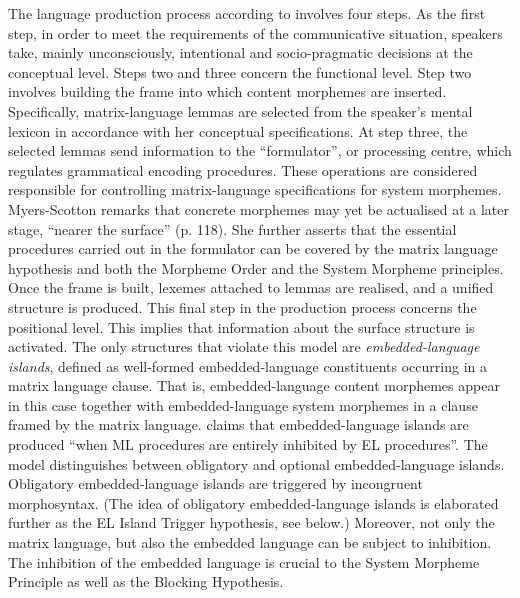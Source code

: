 The language production process according to \citet[116--119]{myers-scotton-duelling-1993} involves four steps. As the first step, in order to meet the requirements of the communicative situation, speakers take, mainly unconsciously, intentional and socio-pragmatic decisions at the conceptual level. Steps two and three concern the functional level. Step two involves building the frame into which content morphemes are inserted. Specifically, matrix-language lemmas are selected from the speaker's mental lexicon in accordance with her conceptual specifications. At step three, the selected lemmas send information to the ``formulator'', or processing centre, which regulates grammatical encoding procedures. These operations are considered responsible for controlling matrix-language specifications for system morphemes. Myers-Scotton remarks that concrete morphemes may yet be actualised at a later stage, ``nearer the surface'' (p. 118). She further asserts that the essential procedures carried out in the formulator can be covered by the matrix language hypothesis and both the Morpheme Order and the System Morpheme principles. Once the frame is built, lexemes attached to lemmas are realised, and a unified structure is produced. This final step in the production process concerns the positional level. This implies that information about the surface structure is activated. The only structures that violate this model are \textit{embedded-language islands}, defined as well-formed embedded-language constituents occurring in a matrix language clause. That is, embedded-language content morphemes appear in this case together with embedded-language system morphemes in a clause framed by the matrix language. \citet[119]{myers-scotton-duelling-1993} claims that embedded-language islands are produced ``when ML procedures are entirely inhibited by EL procedures''. The model  distinguishes between obligatory and optional embedded-language islands. Obligatory embedded-language islands are triggered by incongruent morphosyntax. (The idea of obligatory em\-bed\-ded-lan\-guage islands is elaborated further as the EL Island Trigger hypothesis, see below.) Moreover, not only the matrix language, but also the embedded language can be subject to inhibition. The inhibition of the embedded language is crucial to the System Morpheme Principle as well as the Blocking Hypothesis.

